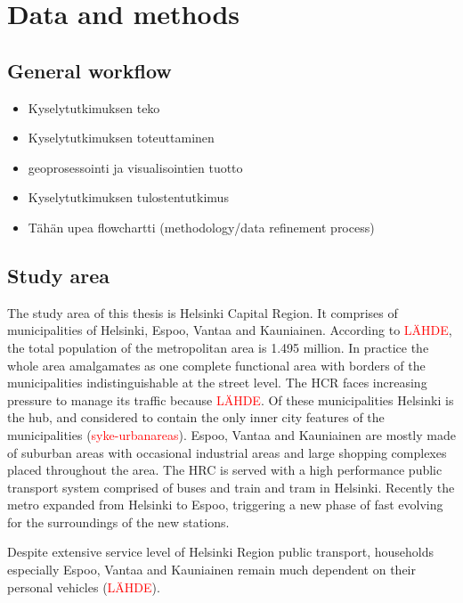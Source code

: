 \section{Data and methods}
\subsection{General workflow}
\justify
\begin{itemize}
    \item Kyselytutkimuksen teko
    \item Kyselytutkimuksen toteuttaminen
    \item geoprosessointi ja visualisointien tuotto
    \item Kyselytutkimuksen tulostentutkimus
    \item Tähän upea flowchartti (methodology/data refinement process)
\end{itemize}

\subsection{Study area}
\justify
The study area of this thesis is Helsinki Capital Region. It comprises of municipalities of Helsinki, Espoo, Vantaa and Kauniainen. According to \textcolor{red}{LÄHDE}, the total population of the metropolitan area is 1.495 million. In practice the whole area amalgamates as one complete functional area with borders of the municipalities indistinguishable at the street level. The HCR faces increasing pressure to manage its traffic because \textcolor{red}{LÄHDE}. Of these municipalities Helsinki is the hub, and considered to contain the only inner city features of the municipalities (\textcolor{red}{syke-urbanareas}). Espoo, Vantaa and Kauniainen are mostly made of suburban areas with occasional industrial areas and large shopping complexes placed throughout the area. The HRC is served with a high performance public transport system comprised of buses and train and tram in Helsinki. Recently the metro expanded from Helsinki to Espoo, triggering a new phase of fast evolving for the surroundings of the new stations.

Despite extensive service level of Helsinki Region public transport, households especially Espoo, Vantaa and Kauniainen remain much dependent on their personal vehicles (\textcolor{red}{LÄHDE}). 

